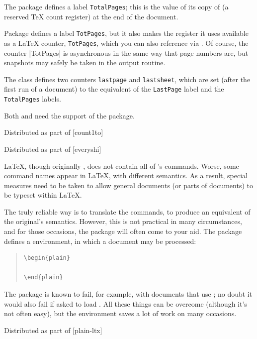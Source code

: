 The  package defines a label \texttt{TotalPages}; this is
the value of its copy of  (a reserved \TeX{} count
register) at the end of the document.

Package  defines a label \texttt{TotPages}, but it also
makes the register it uses available as a \LaTeX{} counter,
\texttt{TotPages}, which you can also reference via .  Of
course, the counter |TotPages| is asynchronous in the same way that
page numbers are, but snapshots may safely be taken in the output
routine.

The  class defines two counters \texttt{lastpage} and
\texttt{lastsheet}, which are set (after the first run of a document)
to the equivalent of the \texttt{LastPage} label and the
\texttt{TotalPages} labels.

Both  and  need the support of
the  package.
\begin{ctanrefs}
\item[count1to.sty]Distributed as part of [count1to]
\item[everyshi.sty]Distributed as part of [everyshi]
\item[lastpage.sty]
\item[memoir.cls]
\item[totpages.sty]
\end{ctanrefs}


\LaTeX{}, though originally , does not
contain all of \plaintex{}'s commands.  Worse, some \plaintex{}
command names appear in \LaTeX{}, with different semantics.  As a
result, special measures need to be taken to allow general \plaintex{}
documents (or parts of documents) to be typeset within \LaTeX{}.

The truly reliable way is to translate the \plaintex{} commands, to
produce an equivalent of the original's semantics.  However, this is
not practical in many circumstances, and for those occasions, the
 package will often come to your aid.  The package
defines a  environment, in which a \plaintex{}
document may be processed:
\begin{quote}
\begin{verbatim}
\begin{plain}
  
\end{plain}
\end{verbatim}
\end{quote}
The package is known to fail, for example, with documents that use
\AMSTeX{}; no doubt it would also fail if asked to load \Eplain{}.
All these things can be overcome (although it's not often easy), but
the environment saves a lot of work on many occasions.
\begin{ctanrefs}
\item[plain.sty]Distributed as part of [plain-ltx]
\end{ctanrefs}

